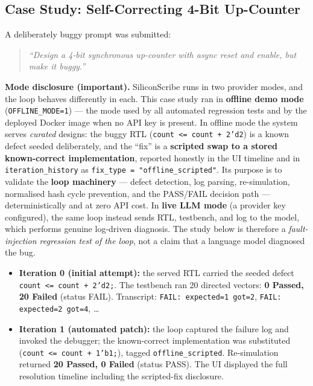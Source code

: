\documentclass[11pt,a4paper]{article}
\begin{document}
\subsection{Case Study: Self-Correcting 4-Bit Up-Counter}
A deliberately buggy prompt was submitted:
\begin{quote}
\itshape ``Design a 4-bit synchronous up-counter with async reset and enable, but
make it buggy.''
\end{quote}

\noindent\textbf{Mode disclosure (important).} SiliconScribe runs in two provider
modes, and the loop behaves differently in each. This case study ran in
\textbf{offline demo mode} (\texttt{OFFLINE\_MODE=1}) --- the mode used by all
automated regression tests and by the deployed Docker image when no API key is
present. In offline mode the system serves \emph{curated} designs: the buggy RTL
(\texttt{count <= count + 2'd2}) is a known defect seeded deliberately, and the
``fix'' is a \textbf{scripted swap to a stored known-correct implementation},
reported honestly in the UI timeline and in \texttt{iteration\_history} as
\texttt{fix\_type = "offline\_scripted"}. Its purpose is to validate the
\textbf{loop machinery} --- defect detection, log parsing, re-simulation, normalised
hash cycle prevention, and the PASS/FAIL decision path --- deterministically and at
zero API cost. In \textbf{live LLM mode} (a provider key configured), the same loop
instead sends RTL, testbench, and log to the model, which performs genuine
log-driven diagnosis. The study below is therefore a \emph{fault-injection
regression test of the loop}, not a claim that a language model diagnosed the bug.

\begin{itemize}
\item \textbf{Iteration 0 (initial attempt):} the served RTL carried the seeded
defect \texttt{count <= count + 2'd2;}. The testbench ran 20 directed vectors:
\textbf{0 Passed, 20 Failed} (status FAIL). Transcript:
\texttt{FAIL: expected=1 got=2}, \texttt{FAIL: expected=2 got=4}, \ldots
\item \textbf{Iteration 1 (automated patch):} the loop captured the failure log and
invoked the debugger; the known-correct implementation was substituted
(\texttt{count <= count + 1'b1;}), tagged \texttt{offline\_scripted}. Re-simulation
returned \textbf{20 Passed, 0 Failed} (status PASS). The UI displayed the full
resolution timeline including the scripted-fix disclosure.
\end{itemize}
\end{document}
